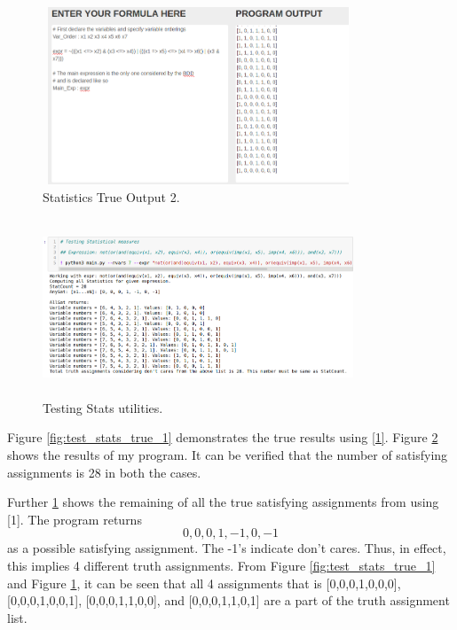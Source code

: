 \documentclass[a4paper, titlepage, 12pt]{article}
\numberwithin{equation}{section}
\begin{document}
\begin{itemize}
                    \begin{figure}[htp]
                        \centering
                        \includegraphics[height=200px, width=350px]{img/test_stats_true_2.png}
                        \caption{Statistics True Output 2.}
                        \label{fig:test_stats_true_2}
                    \end{figure}

                    \begin{figure}[htp]
                        \centering
                        \includegraphics[height=200px, width=350px]{img/test_stats.png}
                        \caption{Testing Stats utilities.}
                        \label{fig:test_stats}
                    \end{figure}

                    Figure \ref{fig:test_stats_true_1} demonstrates the true results using \href{http://formal.cs.utah.edu:8080/pbl/BDD.php}{[1]}.
                    Figure \ref{fig:test_stats} shows the results of my program.
                    It can be verified that the number of satisfying assignments is 28 in both the cases.

                    Further \ref{fig:test_stats_true_2} shows the remaining of all the true satisfying assignments from using [1].
                    The program returns \[0,0,0,1,-1,0,-1\] as a possible satisfying assignment.
                    The -1's indicate don't cares.
                    Thus, in effect, this implies 4 different truth assignments.
                    From Figure \ref{fig:test_stats_true_1} and Figure \ref{fig:test_stats_true_2}, it can be seen that all 4 assignments that is [0,0,0,1,0,0,0], [0,0,0,1,0,0,1], [0,0,0,1,1,0,0], and [0,0,0,1,1,0,1] are a part of the truth assignment list.


\end{itemize}
\end{document}
